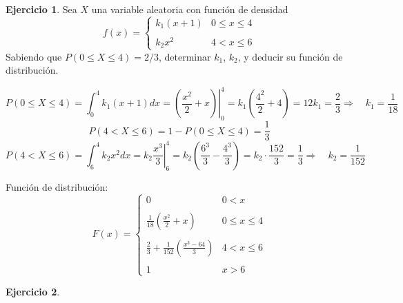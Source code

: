 \documentclass[a4paper, 12pt]{article}
\theoremstyle{definition}
\newtheorem{ej}{Ejercicio}
\begin{document}
\begin{ej}
	Sea $X$ una variable aleatoria con función de densidad
	\[
	f(x) = \left\{ \begin{array}{cc}
	k_1(x+1) & 0 \leq x \leq 4 \\
	& \\
	k_2x^2 & 4 < x \leq 6
	\end{array} \right.
	\]
	Sabiendo que \(P(0 \leq X \leq 4) = 2/3\), determinar \(k_1\), \(k_2\), y deducir su función de distribución.
	
	\[P(0\leq X\leq 4) = \int_0^4 k_1(x+1) dx = \left. \left(\frac{x^2}{2}+x\right)\right|^4_0 = k_1\left(\frac{4^2}{2}+4\right) = 12k_1 = \frac{2}{3} \Longrightarrow \quad k_1 = \frac{1}{18}\]
	\[P(4<X\leq 6) = 1 - P(0 \leq X \leq 4) = \frac{1}{3}\]
	\[P(4 < X \leq 6) = \int_6^4 k_2x^2 dx = k_2 \left.\frac{x^3}{3}\right|_6^4 = k_2\left(\frac{6^3}{3}-\frac{4^3}{3}\right)= k_2\cdot \frac{152}{3} = \frac{1}{3}\Longrightarrow\quad k_2 = \frac{1}{152}\]
	
	\medskip
	
	Función de distribución:
	\[
	F(x) = \left\{ \begin{array}{cc}
	0 & 0 <x \\
	& \\
	\frac{1}{18}\left(\frac{x^2}{2}+x\right) & 0\leq x \leq 4 \\
	& \\
	\frac{2}{3} + \frac{1}{152}\left(\frac{x^3 - 64}{3}\right) & 4 < x \leq 6 \\
	& \\
	1 & x > 6
	\end{array} \right.
	\]
	
	
\end{ej}

\begin{ej}

\end{ej}
\end{document}
